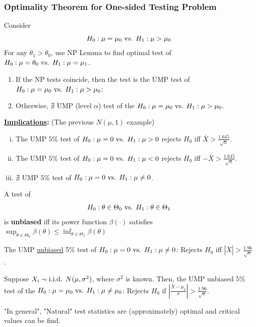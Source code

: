 \documentclass[11pt]{elegantbook}
\begin{document}
\subsubsection*{Optimality Theorem for One-sided Testing Problem}
Consider $$H_0:\mu=\mu_0 \textnormal{ vs. }H_1:\mu>\mu_0$$
For any $\theta_1>\theta_0$, use NP Lemma to find optimal test of $H_0:\mu=\theta_0 \textnormal{ vs. }H_1:\mu=\mu_1$.
\begin{enumerate}[$\circ$]
    \item If the NP tests coincide, then the test is the UMP test of $H_0:\mu=\mu_0 \textnormal{ vs. }H_1:\mu>\mu_0$;
    \item Otherwise, $\nexists$ UMP (level $\alpha$) test of the $H_0:\mu=\mu_0 \textnormal{ vs. }H_1:\mu>\mu_0$.
\end{enumerate}
\textbf{\underline{Implications}:} (The previous $N(\mu,1)$ example)
\begin{enumerate}[(i).]
    \item The UMP $5\%$ test of $H_0:\mu=0 \textnormal{ vs. }H_1:\mu>0$ rejects $H_0$ iff $\bar{X}>\frac{1.645}{\sqrt{n}}$.
    \item The UMP $5\%$ test of $H_0:\mu=0 \textnormal{ vs. }H_1:\mu<0$ rejects $H_0$ iff $-\bar{X}>\frac{1.645}{\sqrt{n}}$.
    \item $\nexists$ UMP $5\%$ test of $H_0:\mu=0 \textnormal{ vs. }H_1:\mu\neq 0$.
\end{enumerate}

\begin{definition}
    \normalfont
    A test of $$H_0:\theta\in\Theta_0 \textnormal{ vs. }H_1:\theta\in\Theta_1$$
    is \textbf{unbiased} iff its power function $\beta(\cdot)$ satisfies $\sup_{\theta\in\Theta_0}\beta(\theta)\leq \inf_{\theta\in\Theta_1}\beta(\theta)$
\end{definition}
\begin{claim}
    The UMP \underline{unbiased} 5\% test of $H_0:\mu=0 \textnormal{ vs. }H_1:\mu\neq 0$: Rejects $H_0$ iff $|\bar{X}|>\frac{1.96}{\sqrt{n}}$.
\end{claim}
\begin{corollary}
    Suppose $X_i\sim \textnormal{i.i.d. }N(\mu,\sigma^2)$, where $\sigma^2$ is known. Then, the UMP unbiased $5\%$ test of the $H_0:\mu=\mu_0 \textnormal{ vs. }H_1:\mu\neq \mu_0$: Rejects $H_0$ if $|\frac{\bar{X}-\mu_0}{\sigma}|>\frac{1.96}{\sqrt{n}}$.
\end{corollary}

\begin{claim}
    "In general", "Natural" test statistics are (approximately) optimal and critical values can be find.
\end{claim}
\end{document}
